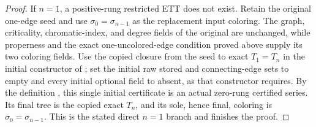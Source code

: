 \begin{proof}
If \(n=1\), a positive-rung restricted ETT does not exist.  Retain the
original one-edge seed and use \(\sigma_0=\sigma_{n-1}\) as the replacement
input coloring.  The graph, criticality, chromatic-index, and degree fields
of the original  are unchanged, while properness and the
exact one-uncolored-edge condition proved above supply its two coloring
fields.  Use the copied closure from the seed to exact \(T_1=T_n\) in the
initial constructor of ; set the initial raw
stored and connecting-edge sets to empty and every initial optional field
to absent, as that constructor requires.  By the definition
, this single initial certificate is an actual
zero-rung certified series.  Its final tree is the copied exact \(T_n\),
and its sole, hence final, coloring is \(\sigma_0=\sigma_{n-1}\).  This is
the stated direct \(n=1\) branch and finishes the proof.
\end{proof}
